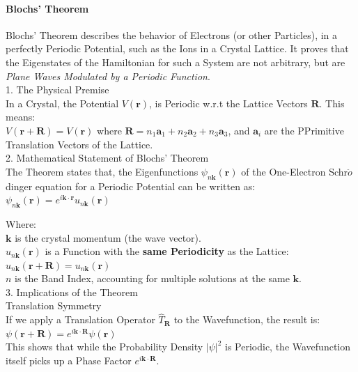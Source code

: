 \documentclass[a4paper, 10pt, onepage]{elegantbook}
\begin{document}
{\paragraph{Blochs' Theorem}  
\noindent

Blochs' Theorem describes the behavior of Electrons (or other Particles), in a perfectly Periodic Potential, such as the Ions in a Crystal Lattice. It proves that the Eigenstates of the Hamiltonian for such a System are not arbitrary, but are \emph{Plane Waves Modulated by a Periodic Function}.  \\

    1. The Physical Premise  \\

In a Crystal, the Potential $V(\mathbf{r})$, is Periodic w.r.t the Lattice Vectors $\mathbf{R}$. This means:  \\
$ V(\mathbf{r} + \mathbf{R}) = V(\mathbf{r}) $
where $\mathbf{R} = n_1 \mathbf{a}_1 + n_2 \mathbf{a}_2 + n_3 \mathbf{a}_3$, and $\mathbf{a}_i$ are the PPrimitive Translation Vectors of the Lattice.  \\

    2. Mathematical Statement of Blochs' Theorem  \\

The Theorem states that, the Eigenfunctions $\psi_{n\mathbf{k}}(\mathbf{r})$ of the One-Electron Schr$\ddot{o}$dinger equation for a Periodic Potential can be written as:
$\psi_{n\mathbf{k}}(\mathbf{r}) = e^{i\mathbf{k} \cdot \mathbf{r}} u_{n\mathbf{k}}(\mathbf{r}) $

Where:  \\
 $\mathbf{k}$ is the crystal momentum (the wave vector).  \\
 $u_{n\mathbf{k}}(\mathbf{r})$ is a Function with the \textbf{same Periodicity} as the Lattice:  \\
 $u_{n\mathbf{k}}(\mathbf{r} + \mathbf{R}) = u_{n\mathbf{k}}(\mathbf{r})$  \\
 $n$ is the Band Index, accounting for multiple solutions at the same $\mathbf{k}$.  \\

    3. Implications of the Theorem  \\

     Translation Symmetry  \\

If we apply a Translation Operator $\hat{T}_{\mathbf{R}}$ to the Wavefunction, the result is:  \\
$\psi(\mathbf{r} + \mathbf{R}) = e^{i\mathbf{k} \cdot \mathbf{R}} \psi(\mathbf{r})$  \\
This shows that while the Probability Density $|\psi|^2$ is Periodic, the Wavefunction itself picks up a Phase Factor $e^{i\mathbf{k} \cdot \mathbf{R}}$.  \\

}
\end{document}
